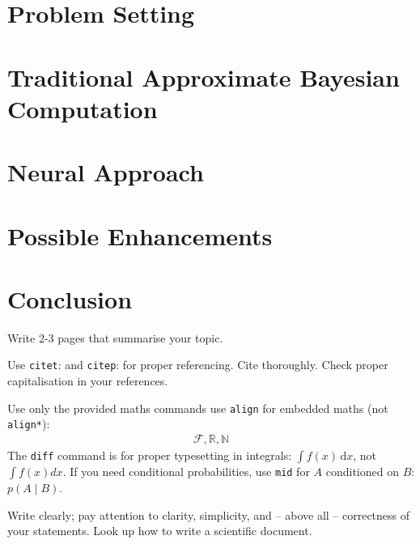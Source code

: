 \documentclass[12pt]{article}
\title{\vskip-3em \bf 
	Simulation-based Inference
    }
\author{
    A Summary Written by Stefan Wezel \\
    \texttt{stefan.wezel@student.uni-tuebingen.de}
}
\date{\it Machine Learning for and with Dynamical Systems\\Summer Term 2021}
\newcommand{\Rbb}{\mathbb{R}}
\newcommand{\Nbb}{\mathbb{N}}
\newcommand{\Fcal}{\mathcal{F}}
\newcommand{\diff}{\,\text{d}}
\begin{document}
\maketitle



\section*{Problem Setting}
\section*{Traditional Approximate Bayesian Computation}
\section*{Neural Approach}
\section*{Possible Enhancements}
\section*{Conclusion}




Write 2-3 pages that summarise your topic.

Use \texttt{citet}: \citet{bosch2021calibrated} and \texttt{citep}: \citep{bosch2021calibrated}
for proper referencing. Cite thoroughly. Check proper capitalisation in your references.

Use only the provided maths commands use \texttt{align} for embedded maths (not \texttt{align*}):
\begin{align}
    \Fcal, \Rbb, \Nbb
\end{align}
The \texttt{diff} command is for proper typesetting in integrals: $\int f(x) \diff x$, not $\int f(x) dx$.
If you need conditional probabilities, use \texttt{mid} for $A$ conditioned on $B$: $p(A \mid B)$.

Write clearly; pay attention to clarity, simplicity, and -- above all -- correctness of your statements. Look up how to write a scientific document.


\end{document}

